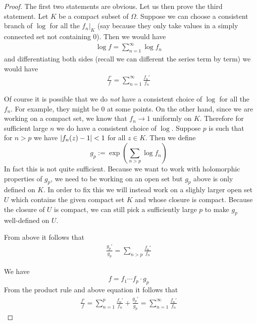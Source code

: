 \begin{proof}
    The first two statements are obvious. Let us then prove the third statement. Let $K$ be a compact subset of $\Omega$. Suppose we can choose a consistent branch of $\log$ for all the $f_n|_K$ (say because they only take values in a simply connected set not containing 0). Then we would have 
    \begin{align*}
        \log f = \sum_{n = 1}^\infty \log f_n
    \end{align*}
    and differentiating both sides (recall we can different the series term by term) we would have 
    \begin{align*}
        \frac{f'}{f} = \sum_{n = 1}^\infty \frac{f_n'}{f_n}
    \end{align*}

    Of course it is possible that we do \textit{not} have a consistent choice of $\log$ for all the $f_n$. For example, they might be 0 at some points. On the other hand, since we are working on a compact set, we know that $f_n \to 1$ uniformly on $K$. Therefore for sufficient large $n$ we do have a consistent choice of $\log$. Suppose $p$ is such that for $n > p$ we have $\left|f_n(z) - 1\right| < 1$ for all $z \in K$. Then we define 
    $$g_p := \exp \left( \sum_{n > p} \log f_n \right)$$
    In fact this is not quite sufficient. Because we want to work with holomorphic properties of $g_p$, we need to be working on an open set but $g_p$ above is only defined on $K$. In order to fix this we will instead work on a slighly larger open set $U$ which contains the given compact set $K$ and whose closure is compact. Because the closure of $U$ is compact, we can still pick a sufficiently large $p$ to make $g_p$ well-defined on $U$. 

    From above it follows that 
    \begin{align*}
        \frac{g_p'}{g_p} = \sum_{n > p} \frac{f_n'}{f_n}
    \end{align*}
    
    We have
    $$ f = f_1 \cdots f_p \cdot g_p  $$
    From the product rule and above equation it follows that
    \begin{align*}
        \frac{f'}{f} = \sum_{n = 1}^p \frac{f_n'}{f_n} + \frac{g_p'}{g_p} = \sum_{n = 1}^\infty \frac{f_n'}{f_n}
    \end{align*}



\end{proof}
